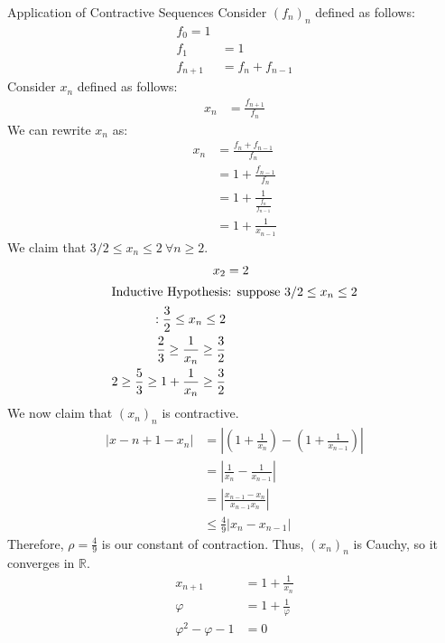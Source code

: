 \documentclass[8pt]{extarticle}
\newcommand{\R}{\mathbb{R}}
\begin{document}
  \begin{problem}{Application of Contractive Sequences}
    Consider $(f_n)_n$ defined as follows:
    \begin{align*}
      f_0 = 1\\
      f_1 &= 1\\
      f_{n+1} &= f_n + f_{n-1}
    \end{align*}
    Consider $x_n$ defined as follows:
    \begin{align*}
      x_n &= \frac{f_{n+1}}{f_n}
    \end{align*}
    We can rewrite $x_n$ as:
    \begin{align*}
      x_n &= \frac{f_n + f_{n-1}}{f_n}\\
          &= 1 + \frac{f_{n-1}}{f_n}\\
          &= 1 + \frac{1}{\frac{f_n}{f_{n-1}}}\\
          &= 1 + \frac{1}{x_{n-1}}
    \end{align*}
    We claim that $3/2 \leq x_n \leq 2~\forall n\geq 2$.
    \begin{align*}
      x_2 &= 2\\
      \shortintertext{Inductive Hypothesis: suppose $3/2 \leq x_n \leq 2$}:
      \frac{3}{2} \leq x_n \leq 2\\
      \frac{2}{3} \geq \frac{1}{x_n} \geq \frac{3}{2}\\
      2 \geq \frac{5}{3} \geq 1 + \frac{1}{x_n} \geq \frac{3}{2}
    \end{align*}
    We now claim that $(x_n)_n$ is contractive.
    \begin{align*}
      \left|x-{n+1}-x_n\right| &= \left|\left(1+\frac{1}{x_n}\right) - \left(1 + \frac{1}{x_{n-1}}\right)\right|\\
                               &= \left|\frac{1}{x_{n}} - \frac{1}{x_{n-1}}\right|\\
                               &= \left|\frac{x_{n-1}-x_{n}}{x_{n-1}x_{n}}\right|\\
                               &\leq \frac{4}{9} |x_{n}-x_{n-1}|
    \end{align*}
    Therefore, $\rho = \frac{4}{9}$ is our constant of contraction. Thus, $(x_n)_n$ is Cauchy, so it converges in $\R$.
    \begin{align*}
      x_{n+1} &= 1 + \frac{1}{x_{n}}\tag{$n \rightarrow \infty,~x_n \rightarrow \varphi$}\\
      \varphi &= 1 + \frac{1}{\varphi}\\
      \varphi^2 - \varphi - 1 &= 0\\

\end{align*}
\end{problem}
\end{document}
